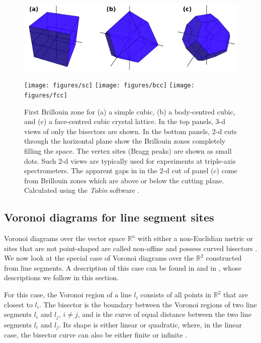 \begin{figure}[h]
	\begin{center}
		\includegraphics[width = 0.95 \textwidth]{figures/bz}

		\vspace{0.5cm}
		\texttt{[image: figures/sc]}
		\hspace{2.2cm}
		\texttt{[image: figures/bcc]}
		\hspace{2.2cm}
		\texttt{[image: figures/fcc]}
	\end{center}
	\caption[Brillouin zones.]{
		First Brillouin zone for
			(a) a simple cubic,
			(b) a body-centred cubic, and
			(c) a face-centred cubic crystal lattice.
		In the top panels, 3-d views of only the bisectors are shown.
		In the bottom panels, 2-d cuts through the horizontal plane show the Brillouin zones 
		completely filling the space. The vertex sites (Bragg peaks) are shown as small dots.
		Such 2-d views are typically used for experiments at triple-axis spectrometers.
		The apparent gaps in in the 2-d cut of panel (c) come from Brillouin zones which are 
		above or below the cutting plane.
		Calculated using the \textit{Takin} software \cite{Takin2021, Takin2017, Takin2016}.
		\label{fig:cubic_bzs}}
\end{figure}



\subsection{Voronoi diagrams for line segment sites}
\label{sec:voro_ls}
Voronoi diagrams over the vector space $\mathbb{R}^n$ with either a non-Euclidian metric or sites that
are not point-shaped are called non-affine and possess curved bisectors \cite[p. 72]{Boissonnat2006}.
We now look at the special case of Voronoi diagrams over the $\mathbb{R}^2$ constructed from line segments.
A description of this case can be found in \cite[Ch. 7.3, pp. 160-163]{Berg2008} and in 
\cite[Ch. 5.4.2, pp. 242-247]{FUH_geo2020}, whose descriptions we follow in this section.

For this case, the Voronoi region of a line $l_i$ consists of all points in $\mathbb{R}^2$ that 
are closest to $l_i$. The bisector is the boundary between the Voronoi regions of two line segments 
$l_i$ and $l_j$, $i \neq j$,
and is the curve of equal distance between the two line segments $l_i$ and $l_j$.
Its shape is either linear or quadratic, where, in the linear case, the bisector curve can also be either
finite or infinite \cite[Ch. 5.4.2, pp. 243-244]{FUH_geo2020}.

